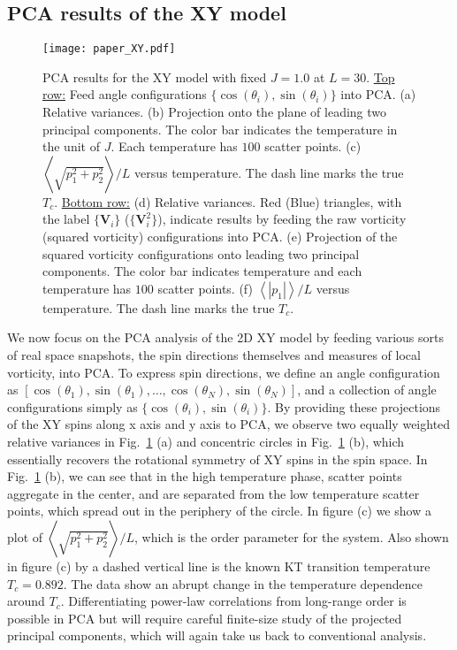 \documentclass[pra,letterpaper,10pt,twocolumn]{revtex4}
\begin{document}
\subsection{PCA results of the XY model}

\begin{figure}[!h]
\texttt{[image: paper\_XY.pdf]}  
\caption{
PCA results for the XY model with fixed $J=1.0$ at $L=30$.
\underline{Top row:} Feed angle configurations $\{\cos(\theta_i),
\sin(\theta_i)\}$ into PCA.  (a) Relative variances. (b) Projection onto
the plane of leading two principal components. The color bar indicates
the temperature in the unit of $J$. Each temperature has $100$ scatter
points. (c) $\left\langle\sqrt{p^2_1+p^2_2}\right\rangle /L$ versus
temperature. The dash line marks the true $T_c$. \underline{Bottom row:}
(d) Relative variances. Red (Blue) triangles, with the label
$\{\mathbf{V}_i\}$ ($\{\mathbf{V}^2_i\}$), indicate results by feeding
the raw vorticity (squared vorticity) configurations into PCA. (e)
Projection of the squared vorticity configurations onto leading two
principal components. The color bar indicates temperature and each
temperature has $100$ scatter points. (f)
$\left\langle|p_1|\right\rangle/L$ versus temperature. The dash line
marks the true $T_c$.
\label{fig:XY_model}
}
\end{figure}

We now focus on the PCA analysis of the 2D XY model by feeding various
sorts of real space snapshots, the spin directions themselves and
measures of local vorticity, into PCA. To express spin directions, we
define an angle configuration as $[\cos(\theta_1), \sin(\theta_1),\dots,
\cos(\theta_N), \sin(\theta_N)]$, and a collection of angle
configurations simply as $\{\cos(\theta_i), \sin(\theta_i)\}$. By
providing these projections of the XY
spins along x axis and y axis to PCA, we observe two equally weighted
relative variances in Fig.~\ref{fig:XY_model} (a) and concentric circles
in Fig.~\ref{fig:XY_model} (b), which essentially recovers the
rotational symmetry of XY spins in the spin space. In
Fig.~\ref{fig:XY_model} (b), we can see that in the high temperature phase,
scatter points aggregate in the center, and are separated from the low
temperature scatter points, which spread out in the periphery of the
circle.  In figure (c) we show a plot of $\left\langle
\sqrt{p^2_1+p^2_2} \right\rangle /L$, which is the order parameter for
the system.  Also shown in figure (c) by a dashed vertical line is the
known KT transition temperature $T_c=0.892$\cite{Olsson}.  The data show
an abrupt change in the temperature dependence around $T_c$.
Differentiating power-law correlations from long-range order is possible
in PCA but will require careful finite-size study of the projected
principal components, which will again take us back to conventional
analysis. 
\end{document}
